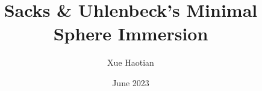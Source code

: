 \documentclass[UTF8,12pt]{article}
\title{Sacks \& Uhlenbeck's Minimal Sphere Immersion}
\author{Xue Haotian}
\date{June 2023}
\theoremstyle{plain}\newtheorem{theorem}{Theorem}
\theoremstyle{definition}\newtheorem{definition}[theorem]{Definition}
\theoremstyle{definition}\newtheorem{example}[theorem]{Example}
\theoremstyle{plain}\newtheorem{axiom}[theorem]{Axiom}
\theoremstyle{plain}\newtheorem{assertion}[theorem]{Assertion}
\theoremstyle{plain}\newtheorem{corollary}[theorem]{Corollary}
\theoremstyle{plain}\newtheorem{lemma}[theorem]{Lemma}
\theoremstyle{plain}\newtheorem{proposition}[theorem]{Proposition}
\theoremstyle{plain}\newtheorem{prop}[theorem]{Proposition}
\theoremstyle{plain}\newtheorem{conjecture}[theorem]{Conjecture}
\theoremstyle{plain}\newtheorem{conj}[theorem]{Conjecture}
\theoremstyle{plain}\newtheorem{problem}[theorem]{Problem}
\theoremstyle{remark}\newtheorem{notation}[theorem]{Notation}
\theoremstyle{definition}\newtheorem*{question}{Question}
\theoremstyle{definition}\newtheorem*{answer}{Answer}
\theoremstyle{definition}\newtheorem*{goal}{Goal}
\theoremstyle{plain}\newtheorem*{application}{Application}
\theoremstyle{plain}\newtheorem*{exercise}{Exercise}
\theoremstyle{remark}\newtheorem*{remark}{Remark}
\theoremstyle{remark}\newtheorem*{note}{\small{Note}}
\numberwithin{equation}{section}
\numberwithin{theorem}{section}
\numberwithin{figure}{section}
\begin{document}
\maketitle

\begin{comment}
\section{Preliminaries}
A priori \(L^p\) estimate and Schauder estimate for elliptic equation:
\begin{theorem}[\(L^p\) estimate]
    Let \(\Omega\) be open set in \(\mathbb{R}^n\) and \(u\in W_{\text{loc}}^{2,p}
    (\Omega)\cap L^p(\Omega)\), \(1<p<\infty\). Assume \(u\) is a strong solution
    of equation \[
        Lu=a^{ij}u_{ij}+b^i u_i+cu=f
    .\] Suppose the coefficients satisfy
    \begin{itemize}
    \item \(a^{ij}\in C^0(\Omega)\), \(b^i,c\in L^\infty(\Omega)\), \(f\in
        L^p(\Omega)\);
    \item \(a^{ij}\xi_i\xi_j\ge \lambda|\xi|^2\), for some \(\lambda>0\),
        \(\forall\,x\in \Omega\xi\in \mathbb{R}^n\);
    \item \(|a^{ij}|,|b^i|,|c|\le M\) for some \(M>0\).
    \end{itemize}
    Then for any \(\Omega'\subset \subset \Omega\), \[
        \|u\|_{W^{2,p}(\Omega')}\le C(\|u\|_{L^p(\Omega)}+\|f\|_{L^p(\Omega)})
    .\] 
\end{theorem}
\begin{theorem}[Schauder estimate]
    Let \(\Omega\) be an open set in \(\mathbb{R}^n\), \(u\in C^{2,\alpha}(\Omega)\)
    be a bounded solution of equation \[
        Lu=a^{ij}u_{ij}+b^i u_i+cu=f
    .\] Suppose the coefficients satisfy
    \begin{itemize}
    \item \(a^{ij}\xi_i\xi_j\ge \lambda|\xi|^2\), for some \(\lambda>0\),
        \(\forall\,x\in \Omega,\xi\in \mathbb{R}^n\);
    \item \(\|a^{ij}\|_{C^{0,\alpha}(\Omega)}^{(0)},\|b^i\|_{C^{0,\alpha}(\Omega)}
        ^{(1)},\|c\|_{C^{0,\alpha}(\Omega)}^{(2)}\le M\) for some \(M>0\).
    \end{itemize}
    Then \[
        \|u\|_{C^{2,\alpha}(\Omega)}^*\le C(\|u\|_{C^0(\Omega)}
        +\|f\|_{C^{0,\alpha}(\Omega)}^{(2)})
    .\] 
\end{theorem}
Reference: Gilbarg-Trudinger, thm 9.11 and thm 6.2.
\end{comment}
\end{document}

